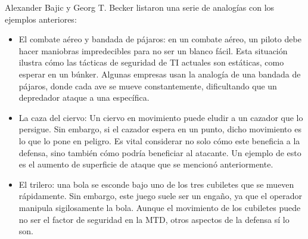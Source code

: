 Alexander Bajic y Georg T. Becker listaron una serie de analogías\cite{MTD-critica} con los ejemplos anteriores:
\begin{itemize}
    \item El combate aéreo y bandada de pájaros: en un combate aéreo, un piloto debe hacer maniobras impredecibles para no ser un blanco fácil. Esta situación ilustra cómo las tácticas de seguridad de TI actuales son estáticas, como esperar en un búnker. Algunas empresas usan la analogía de una bandada de pájaros, donde cada ave se mueve constantemente, dificultando que un depredador ataque a una específica.
    \item La caza del ciervo: Un ciervo en movimiento puede eludir a un cazador que lo persigue. Sin embargo, si el cazador espera en un punto, dicho movimiento es lo que lo pone en peligro. Es vital considerar no solo cómo este beneficia a la defensa, sino también cómo podría beneficiar al atacante. Un ejemplo de esto es el aumento de superficie de ataque que se mencionó anteriormente.
    \item El trilero: una bola se esconde bajo uno de los tres cubiletes que se mueven rápidamente. Sin embargo, este juego suele ser un engaño, ya que el operador manipula sigilosamente la bola. Aunque el movimiento de los cubiletes puede no ser el factor de seguridad en la MTD, otros aspectos de la defensa sí lo son.
\end{itemize}

